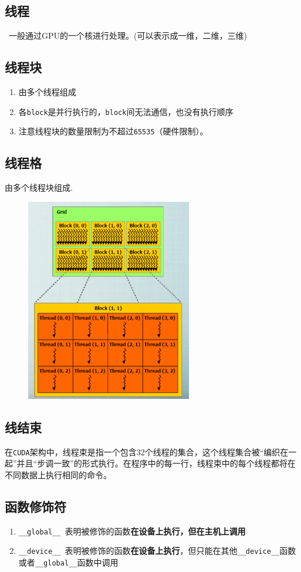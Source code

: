\documentclass[UTF8,a4paper,12pt]{ctexbook}
\begin{document}
		\subsection{线程}
			 一般通过GPU的一个核进行处理。(可以表示成一维，二维，三维)
			 
		\subsection{线程块}
			\begin{enumerate}
				\item 由多个线程组成
				\item 各\verb|block|是并行执行的，\verb|block|间无法通信，也没有执行顺序
				\item 注意线程块的数量限制为不超过\verb|65535|（硬件限制）。
			\end{enumerate}
			
		\subsection{线程格}
			由多个线程块组成.
			
			\begin{figure}[h]
				\centering
				\includegraphics[scale = 1.2]{ThreadCUDA.png}
			\end{figure}
			
		\subsection{线结束}
			在\verb|CUDA|架构中，线程束是指一个包含32个线程的集合，这个线程集合被“编织在一起”并且“步调一致”的形式执行。在程序中的每一行，线程束中的每个线程都将在不同数据上执行相同的命令。
		
		\subsection{函数修饰符}	
			\begin{enumerate}
				\item \verb|__global__ |表明被修饰的函数\textbf{在设备上执行，但在主机上调用}	
				\item \verb|__device__ |表明被修饰的函数\textbf{在设备上执行}，但只能在其他\verb|__device__|函数或者\verb|__global__|函数中调用
			\end{enumerate}
\end{document}
